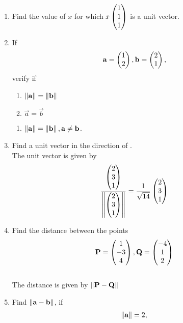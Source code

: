 \documentclass[journal,12pt,twocolumn]{IEEEtran}
\renewcommand\thesection{\arabic{section}}
\begin{document}
\begin{enumerate}[label=\thesection.\arabic*.,ref=\thesection.\theenumi]
\item Find the value of $x$ for which $x\begin{pmatrix}1\\1\\1\end{pmatrix}$ is a unit vector.
\\
\solution
\item If
\begin{align}
\mathbf{a} = \begin{pmatrix}1\\2\end{pmatrix}, \mathbf{b} = \begin{pmatrix}2\\1\end{pmatrix},
\end{align}
verify if  
\begin{enumerate}
\item $\left\lVert\mathbf{a}\right\rVert=\left\lVert\mathbf{b}\right\rVert$

\item $\vec{a}=\vec{b}$
\end{enumerate}
%
\solution
\begin{enumerate}
\item $\left\lVert\mathbf{a}\right\rVert=\left\lVert\mathbf{b}\right\rVert,\mathbf{a}\ne\mathbf{b}$.
\end{enumerate}
\item Find a unit vector in the  direction of .
%
\\
\solution The unit vector is given by 
\begin{align}
\frac{\begin{pmatrix}2\\3\\1\end{pmatrix}}{\left\lVert\begin{pmatrix}2\\3\\1\end{pmatrix}\right\rVert} = \frac{1}{\sqrt{14}}\begin{pmatrix}2\\3\\1\end{pmatrix}
\end{align}
\item Find the distance between the points
%
\begin{align}
\mathbf{P} = \begin{pmatrix}1\\-3\\4\end{pmatrix},
\mathbf{Q} = \begin{pmatrix}-4\\1\\2\end{pmatrix}
\end{align}
%
\solution 
\\
The distance is given by $\left\lVert\mathbf{P}-\mathbf{Q}\right\rVert$
\item Find $\left\lVert\mathbf{a}-\mathbf{b}\right\rVert$, if 
\begin{align}
\norm{\vec{a}} = 2, 

\end{align}
\end{enumerate}
\end{document}
